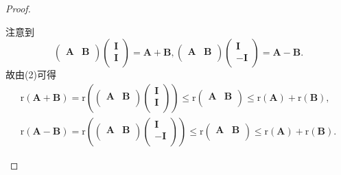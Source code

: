 \documentclass[../../main.tex]{subfiles}
\begin{document}
\begin{proof}
\begin{enumerate}[(1)]
注意到
\[
\left( \begin{matrix}
\boldsymbol{A}&		\boldsymbol{B}\\
\end{matrix} \right) \left( \begin{array}{c}
\boldsymbol{I}\\
\boldsymbol{I}\\
\end{array} \right) =\boldsymbol{A}+\boldsymbol{B},\left( \begin{matrix}
\boldsymbol{A}&		\boldsymbol{B}\\
\end{matrix} \right) \left( \begin{array}{c}
\boldsymbol{I}\\
-\boldsymbol{I}\\
\end{array} \right) =\boldsymbol{A}-\boldsymbol{B}.
\]
故由(2)可得
\begin{align*}
\mathrm{r}\left( \boldsymbol{A}+\boldsymbol{B} \right) =\mathrm{r}\left( \left( \begin{matrix}
\boldsymbol{A}&		\boldsymbol{B}\\
\end{matrix} \right) \left( \begin{array}{c}
\boldsymbol{I}\\
\boldsymbol{I}\\
\end{array} \right) \right) \leqslant \mathrm{r}\left( \begin{matrix}
\boldsymbol{A}&		\boldsymbol{B}\\
\end{matrix} \right) \leqslant \mathrm{r}\left( \boldsymbol{A} \right) +\mathrm{r}\left( \boldsymbol{B} \right) ,
\\
\mathrm{r}\left( \boldsymbol{A}-\boldsymbol{B} \right) =\mathrm{r}\left( \left( \begin{matrix}
\boldsymbol{A}&		\boldsymbol{B}\\
\end{matrix} \right) \left( \begin{array}{c}
\boldsymbol{I}\\
-\boldsymbol{I}\\
\end{array} \right) \right) \leqslant \mathrm{r}\left( \begin{matrix}
\boldsymbol{A}&		\boldsymbol{B}\\
\end{matrix} \right) \leqslant \mathrm{r}\left( \boldsymbol{A} \right) +\mathrm{r}\left( \boldsymbol{B} \right) .
\end{align*}


\end{enumerate}
\end{proof}
\end{document}
